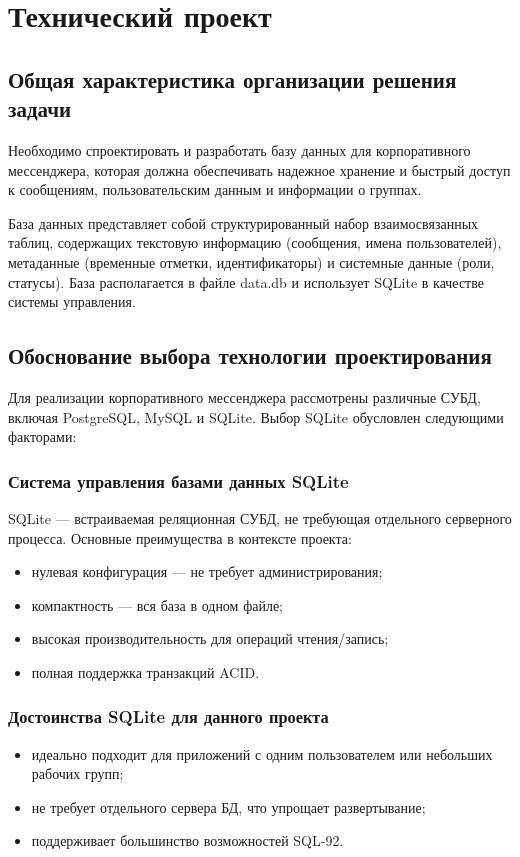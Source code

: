 \section{Технический проект}
\subsection{Общая характеристика организации решения задачи}

Необходимо спроектировать и разработать базу данных для корпоративного мессенджера, которая должна обеспечивать надежное хранение и быстрый доступ к сообщениям, пользовательским данным и информации о группах.

База данных представляет собой структурированный набор взаимосвязанных таблиц, содержащих текстовую информацию (сообщения, имена пользователей), метаданные (временные отметки, идентификаторы) и системные данные (роли, статусы). База располагается в файле data.db и использует SQLite в качестве системы управления.

\subsection{Обоснование выбора технологии проектирования}

Для реализации корпоративного мессенджера рассмотрены различные СУБД, включая PostgreSQL, MySQL и SQLite. Выбор SQLite обусловлен следующими факторами:

\subsubsection{Система управления базами данных SQLite}

SQLite — встраиваемая реляционная СУБД, не требующая отдельного серверного процесса. Основные преимущества в контексте проекта:

\begin{itemize}
	\item нулевая конфигурация — не требует администрирования;
	\item компактность — вся база в одном файле;
	\item высокая производительность для операций чтения/запись;
	\item полная поддержка транзакций ACID.
\end{itemize}

\subsubsection{Достоинства SQLite для данного проекта}
\begin{itemize}
	\item идеально подходит для приложений с одним пользователем или небольших рабочих групп;
	\item не требует отдельного сервера БД, что упрощает развертывание;
	\item поддерживает большинство возможностей SQL-92.
\end{itemize}

